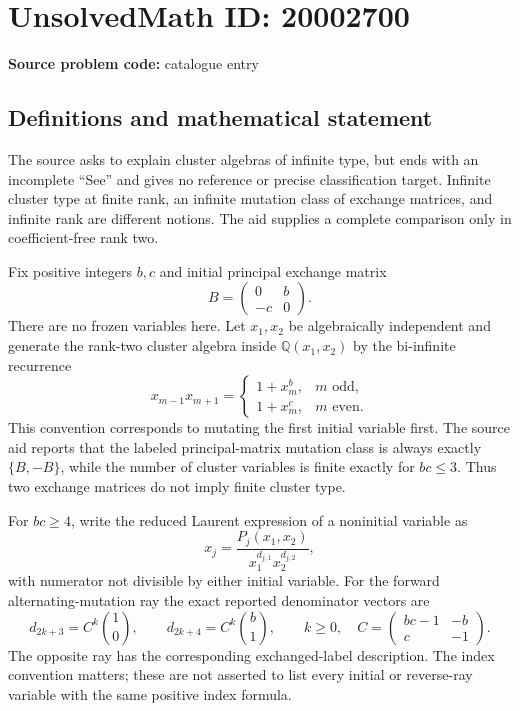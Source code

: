 \documentclass[11pt]{article}
\newcommand{\Q}{\mathbb{Q}}
\begin{document}
\section*{UnsolvedMath ID: 20002700}
\textbf{Source problem code:} catalogue entry
\subsection{Definitions and mathematical statement}
The source asks to explain cluster algebras of infinite type, but ends with an incomplete ``See'' and gives no reference or precise classification target. Infinite cluster type at finite rank, an infinite mutation class of exchange matrices, and infinite rank are different notions. The aid supplies a complete comparison only in coefficient-free rank two.

Fix positive integers $b,c$ and initial principal exchange matrix
\[
 B=\begin{pmatrix}0&b\\-c&0\end{pmatrix}.
\]
There are no frozen variables here. Let $x_1,x_2$ be algebraically independent and generate the rank-two cluster algebra inside $\Q(x_1,x_2)$ by the bi-infinite recurrence
\[
 x_{m-1}x_{m+1}=
 \begin{cases}1+x_m^b,&m\text{ odd},\\
               1+x_m^c,&m\text{ even}.
 \end{cases}
\]
This convention corresponds to mutating the first initial variable first. The source aid reports that the labeled principal-matrix mutation class is always exactly $\{B,-B\}$, while the number of cluster variables is finite exactly for $bc\le3$. Thus two exchange matrices do not imply finite cluster type.

For $bc\ge4$, write the reduced Laurent expression of a noninitial variable as
\[
 x_j=\frac{P_j(x_1,x_2)}{x_1^{d_{j,1}}x_2^{d_{j,2}}},
\]
with numerator not divisible by either initial variable. For the forward alternating-mutation ray the exact reported denominator vectors are
\[
 d_{2k+3}=C^k\binom10,\qquad
 d_{2k+4}=C^k\binom b1,\qquad k\ge0,
 \quad C=\begin{pmatrix}bc-1&-b\\c&-1\end{pmatrix}.
\]
The opposite ray has the corresponding exchanged-label description. The index convention matters; these are not asserted to list every initial or reverse-ray variable with the same positive index formula.
\end{document}
